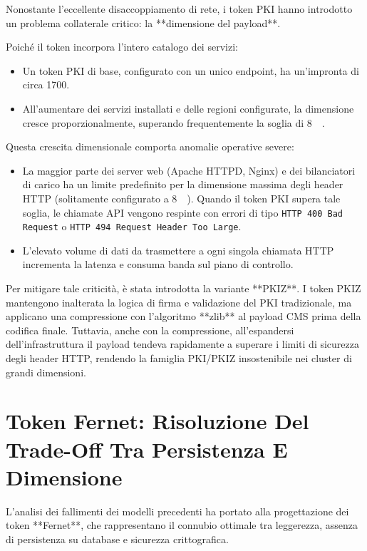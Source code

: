 \documentclass[11pt, a4paper]{article}
\begin{document}
Nonostante l'eccellente disaccoppiamento di rete, i token PKI hanno introdotto un problema collaterale critico: la **dimensione del payload**.

Poiché il token incorpora l'intero catalogo dei servizi:
\begin{itemize}[noitemsep]
    \item Un token PKI di base, configurato con un unico endpoint, ha un'impronta di circa \SI{1700}{\byte}.
    \item All'aumentare dei servizi installati e delle regioni configurate, la dimensione cresce proporzionalmente, superando frequentemente la soglia di \SI{8}{\kilo\byte}.
\end{itemize}

Questa crescita dimensionale comporta anomalie operative severe:
\begin{itemize}
    \item La maggior parte dei server web (Apache HTTPD, Nginx) e dei bilanciatori di carico ha un limite predefinito per la dimensione massima degli header HTTP (solitamente configurato a \SI{8}{\kilo\byte}). Quando il token PKI supera tale soglia, le chiamate API vengono respinte con errori di tipo \texttt{HTTP 400 Bad Request} o \texttt{HTTP 494 Request Header Too Large}.
    \item L'elevato volume di dati da trasmettere a ogni singola chiamata HTTP incrementa la latenza e consuma banda sul piano di controllo.
\end{itemize}

Per mitigare tale criticità, è stata introdotta la variante **PKIZ**. I token PKIZ mantengono inalterata la logica di firma e validazione del PKI tradizionale, ma applicano una compressione con l'algoritmo **zlib** al payload CMS prima della codifica finale. Tuttavia, anche con la compressione, all'espandersi dell'infrastruttura il payload tendeva rapidamente a superare i limiti di sicurezza degli header HTTP, rendendo la famiglia PKI/PKIZ insostenibile nei cluster di grandi dimensioni.

\newpage

\section{Token Fernet: Risoluzione Del Trade-Off Tra Persistenza E Dimensione}

L'analisi dei fallimenti dei modelli precedenti ha portato alla progettazione dei token **Fernet**, che rappresentano il connubio ottimale tra leggerezza, assenza di persistenza su database e sicurezza crittografica.
\end{document}
